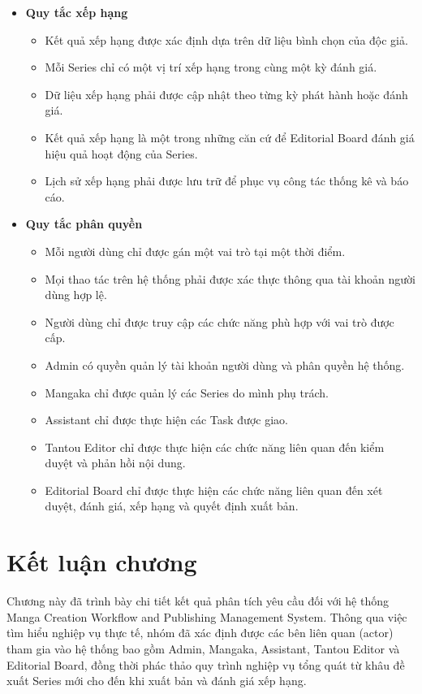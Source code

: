\begin{itemize}
\begin{itemize}
    \end{itemize}
    \item \textbf{Quy tắc xếp hạng}
    \begin{itemize}
        \item Kết quả xếp hạng được xác định dựa trên dữ liệu bình chọn của độc giả.
        \item Mỗi Series chỉ có một vị trí xếp hạng trong cùng một kỳ đánh giá.
        \item Dữ liệu xếp hạng phải được cập nhật theo từng kỳ phát hành hoặc đánh giá.
        \item Kết quả xếp hạng là một trong những căn cứ để Editorial Board đánh giá hiệu quả hoạt động của Series.
        \item Lịch sử xếp hạng phải được lưu trữ để phục vụ công tác thống kê và báo cáo.
    \end{itemize}
    \item \textbf{Quy tắc phân quyền}
    \begin{itemize}
        \item Mỗi người dùng chỉ được gán một vai trò tại một thời điểm.
        \item Mọi thao tác trên hệ thống phải được xác thực thông qua tài khoản người dùng hợp lệ.
        \item Người dùng chỉ được truy cập các chức năng phù hợp với vai trò được cấp.
        \item Admin có quyền quản lý tài khoản người dùng và phân quyền hệ thống.
        \item Mangaka chỉ được quản lý các Series do mình phụ trách.
        \item Assistant chỉ được thực hiện các Task được giao.
        \item Tantou Editor chỉ được thực hiện các chức năng liên quan đến kiểm duyệt và phản hồi nội dung.
        \item Editorial Board chỉ được thực hiện các chức năng liên quan đến xét duyệt, đánh giá, xếp hạng và quyết định xuất bản.
    \end{itemize}
\end{itemize}


\section{Kết luận chương}
\label{sec:ket_luan_chap2}

Chương này đã trình bày chi tiết kết quả phân tích yêu cầu đối với hệ thống Manga Creation Workflow and Publishing Management System. Thông qua việc tìm hiểu nghiệp vụ thực tế, nhóm đã xác định được các bên liên quan (actor) tham gia vào hệ thống bao gồm Admin, Mangaka, Assistant, Tantou Editor và Editorial Board, đồng thời phác thảo quy trình nghiệp vụ tổng quát từ khâu đề xuất Series mới cho đến khi xuất bản và đánh giá xếp hạng.

